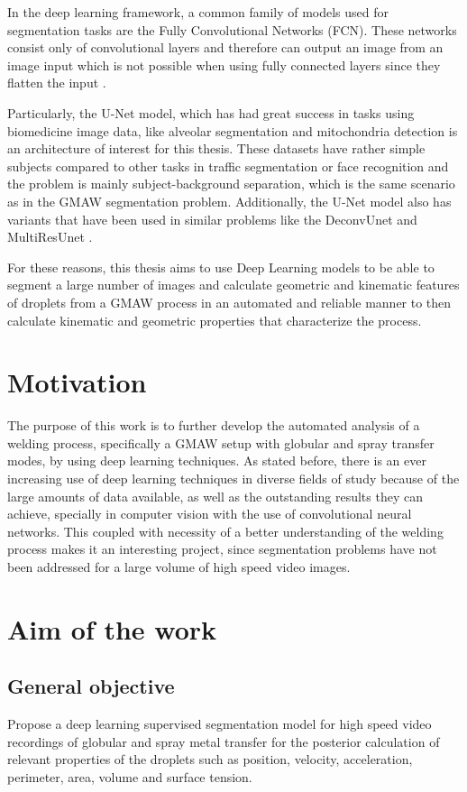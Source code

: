 \begin{intro}
In the deep learning framework, a common family of models used for segmentation tasks are the Fully Convolutional Networks (FCN). These networks consist only of convolutional layers and therefore can output an image from an image input which is not possible when using fully connected layers since they flatten the input \cite{segmentation-survey}. 

Particularly, the U-Net model, which has had great success in tasks using biomedicine image data, like alveolar segmentation and mitochondria detection \cite{Duong, Casser} is an architecture of interest for this thesis. These datasets have rather simple subjects compared to other tasks in traffic segmentation or face recognition and the problem is mainly subject-background separation, which is the same scenario as in the GMAW segmentation problem. Additionally, the U-Net model also has variants that have been used in similar problems like the DeconvUnet and MultiResUnet \cite{Noh, Ibtehaz}.

For these reasons, this thesis aims to use Deep Learning models to be able to segment a large number of images and calculate geometric and kinematic features of droplets from a GMAW process in an automated and reliable manner to then calculate kinematic and geometric properties that characterize the process.

\section{Motivation}

The purpose of this work is to further develop the automated analysis of a welding process, specifically a GMAW setup with globular and spray transfer modes, by using deep learning techniques. As stated before, there is an ever increasing use of deep learning techniques in diverse fields of study because of the large amounts of data available, as well as the outstanding results they can achieve, specially in computer vision with the use of convolutional neural networks. This coupled with necessity of a better understanding of the welding process makes it an interesting project, since segmentation problems have not been addressed for a large volume of high speed video images.

\section{Aim of the work}
\subsection{General objective}
Propose a deep learning supervised segmentation model for high speed video recordings of globular and spray metal transfer for the posterior calculation of relevant properties of the droplets such as position, velocity, acceleration, perimeter, area, volume and surface tension.


\end{intro}
